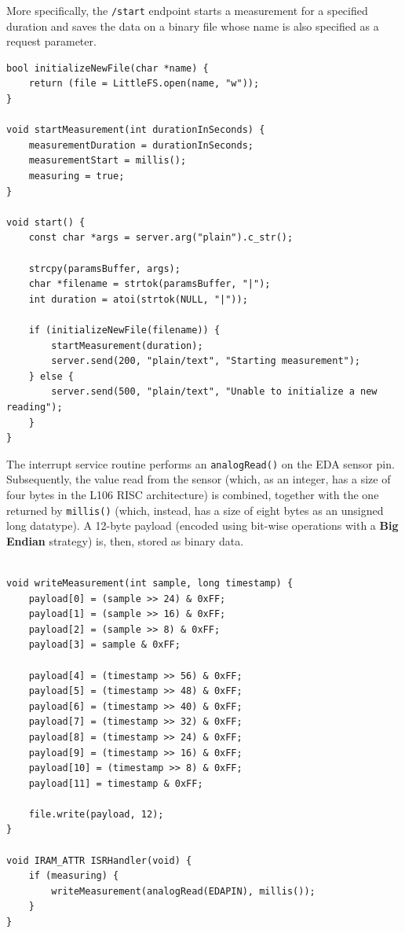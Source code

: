 More specifically, the \texttt{/start} endpoint starts a measurement for a specified duration and saves the data on a binary file whose name is also specified as a request parameter.

\begin{verbatim}
bool initializeNewFile(char *name) {
    return (file = LittleFS.open(name, "w"));
}

void startMeasurement(int durationInSeconds) {
    measurementDuration = durationInSeconds;
    measurementStart = millis();
    measuring = true;
}

void start() {
    const char *args = server.arg("plain").c_str();

    strcpy(paramsBuffer, args);
    char *filename = strtok(paramsBuffer, "|");
    int duration = atoi(strtok(NULL, "|"));

    if (initializeNewFile(filename)) {
        startMeasurement(duration);
        server.send(200, "plain/text", "Starting measurement");
    } else {
        server.send(500, "plain/text", "Unable to initialize a new reading");
    }
}
\end{verbatim}

The interrupt service routine performs an \texttt{analogRead()} on the EDA sensor pin. Subsequently, the value read from the sensor (which, as an integer, has a size of four bytes in the L106 RISC architecture) is combined, together with the one returned by \texttt{millis()} (which, instead, has a size of eight bytes as an unsigned long datatype). A 12-byte payload (encoded using bit-wise operations with a \textbf{Big Endian} strategy) is, then, stored as binary data.


\pagebreak

\begin{verbatim}

void writeMeasurement(int sample, long timestamp) {
    payload[0] = (sample >> 24) & 0xFF;
    payload[1] = (sample >> 16) & 0xFF;
    payload[2] = (sample >> 8) & 0xFF;
    payload[3] = sample & 0xFF;  

    payload[4] = (timestamp >> 56) & 0xFF;
    payload[5] = (timestamp >> 48) & 0xFF;
    payload[6] = (timestamp >> 40) & 0xFF;
    payload[7] = (timestamp >> 32) & 0xFF;
    payload[8] = (timestamp >> 24) & 0xFF;
    payload[9] = (timestamp >> 16) & 0xFF;
    payload[10] = (timestamp >> 8) & 0xFF;
    payload[11] = timestamp & 0xFF;

    file.write(payload, 12);
}

void IRAM_ATTR ISRHandler(void) {
    if (measuring) {
        writeMeasurement(analogRead(EDAPIN), millis());
    }
}
\end{verbatim}

